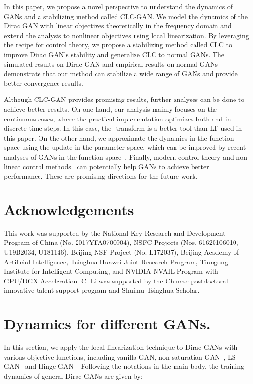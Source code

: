 \documentclass{article}
\theoremstyle{definition}
\begin{document}
In this paper, we propose a novel perspective to understand the dynamics of GANs and a stabilizing method called CLC-GAN. We model the dynamics of the Dirac GAN with linear objectives theoretically in the frequency domain and extend the analysis to nonlinear objectives using local linearization.
By leveraging the recipe for control theory, we propose a stabilizing method called CLC to improve Dirac GAN's stability and generalize CLC to normal GANs. The simulated results on Dirac GAN and empirical results on normal GANs demonstrate that our method can stabilize a wide range of GANs and provide better convergence results.

Although CLC-GAN provides promising results, further analyses can be done to achieve better results. On one hand, our analysis mainly focuses on the continuous cases, where the practical implementation optimizes both  and  in discrete time steps. In this case, the -transform is a better tool than LT used in this paper. On the other hand, we approximate the dynamics in the function space using the update in the parameter space, which can be improved by recent analyses of GANs in the function space~\citep{johnson2018composite}.
Finally, modern control theory and non-linear control methods~\citep{khalil2002nonlinear} can potentially help GANs to achieve better performance. These are promising directions for the future work.

\section*{Acknowledgements}
This work was supported by the National Key Research and Development Program of China (No. 2017YFA0700904), NSFC Projects (Nos. 61620106010, U19B2034, U181146), Beijing NSF Project (No. L172037), Beijing Academy of Artificial Intelligence, Tsinghua-Huawei Joint Research Program, Tiangong Institute for Intelligent Computing, and NVIDIA NVAIL Program with GPU/DGX Acceleration. C. Li was supported by the Chinese postdoctoral innovative talent support program and Shuimu Tsinghua Scholar.


 


\appendix

\section{Dynamics for different GANs.}



In this section, we apply the local linearization technique to Dirac GANs with various objective functions, including vanilla GAN, non-saturation GAN~\cite{goodfellow2014generative}, LS-GAN~\cite{mao2017least} and Hinge-GAN~\cite{miyato2018spectral}. Following the notations in the main body, the training dynamics of general Dirac GANs are given by:
\end{document}
